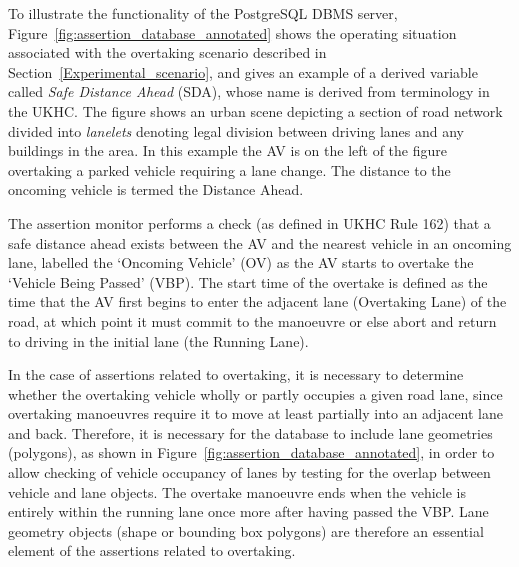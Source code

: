 To illustrate the functionality of the PostgreSQL DBMS server, Figure~\ref{fig:assertion_database_annotated} shows the operating situation associated with the overtaking scenario described in Section~\ref{Experimental_scenario}, and gives an example of a derived variable called \emph{Safe Distance Ahead} (SDA), whose name is derived from terminology in %
the UKHC. The figure shows an urban scene depicting a section of road network divided into \emph{lanelets} denoting legal division between driving lanes and any buildings in the area. In this example the AV is on the left of the figure overtaking a parked vehicle requiring a lane change. The distance to the oncoming vehicle is termed the Distance Ahead. 
%

The assertion monitor performs a check (as defined in UKHC Rule 162) that a safe distance ahead exists between the AV and the nearest vehicle in an oncoming lane, labelled the `Oncoming Vehicle' (OV) as the AV starts to overtake the `Vehicle Being Passed' (VBP). The start time of the overtake is defined as the time that the AV first begins to enter the adjacent lane (Overtaking Lane) of the road, at which point it must commit to the manoeuvre or else abort and return to driving in the initial lane (the Running Lane).

In the case of assertions related to overtaking, it is necessary to determine whether the overtaking vehicle wholly or partly occupies a given road lane, since overtaking manoeuvres require it to move at least partially into an adjacent lane and back. Therefore, it is necessary for the database to include lane geometries (polygons), as shown in Figure~\ref{fig:assertion_database_annotated}, in order to allow checking of vehicle occupancy of lanes by testing for the overlap between vehicle and lane objects. 
The overtake manoeuvre ends when the vehicle is entirely within the running lane once more after having passed the VBP. Lane geometry objects (shape or bounding box polygons) are therefore an essential element of the assertions related to overtaking. 











